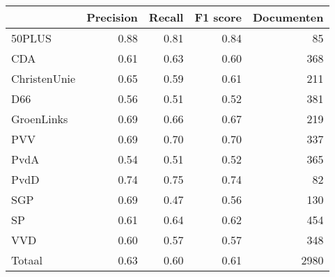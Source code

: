 \begin{tabular}{lrrrr}
\toprule
{} &  Precision &  Recall &  F1 score &  Documenten \\
\midrule
50PLUS       &       0.88 &    0.81 &      0.84 &          85 \\
CDA          &       0.61 &    0.63 &      0.60 &         368 \\
ChristenUnie &       0.65 &    0.59 &      0.61 &         211 \\
D66          &       0.56 &    0.51 &      0.52 &         381 \\
GroenLinks   &       0.69 &    0.66 &      0.67 &         219 \\
PVV          &       0.69 &    0.70 &      0.70 &         337 \\
PvdA         &       0.54 &    0.51 &      0.52 &         365 \\
PvdD         &       0.74 &    0.75 &      0.74 &          82 \\
SGP          &       0.69 &    0.47 &      0.56 &         130 \\
SP           &       0.61 &    0.64 &      0.62 &         454 \\
VVD          &       0.60 &    0.57 &      0.57 &         348 \\
Totaal       &       0.63 &    0.60 &      0.61 &        2980 \\
\bottomrule
\end{tabular}
